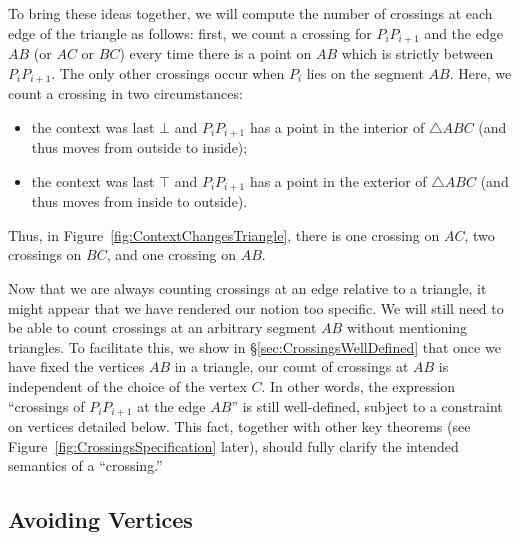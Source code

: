 To bring these ideas together, we will compute the number of crossings at each edge of the triangle as follows: first, we count a crossing for $P_iP_{i+1}$ and the edge $AB$ (or $AC$ or $BC$) every time there is a point on $AB$ which is strictly between $P_iP_{i+1}$. The only other crossings occur when $P_i$ lies on the segment $AB$. Here, we count a crossing in two circumstances:
\begin{itemize}
\item the context was last $\bot$ and $P_iP_{i+1}$ has a point in the interior of $\triangle ABC$ (and thus moves from outside to inside);
\item the context was last $\top$ and $P_iP_{i+1}$ has a point in the exterior of $\triangle ABC$ (and thus moves from inside to outside).
\end{itemize}

Thus, in Figure~\ref{fig:ContextChangesTriangle}, there is one crossing on $AC$, two crossings on $BC$, and one crossing on $AB.$

Now that we are always counting crossings at an edge relative to a triangle, it might appear that we have rendered our notion too specific. We will still need to be able to count crossings at an arbitrary segment $AB$ without mentioning triangles. To facilitate this, we show in \S\ref{sec:CrossingsWellDefined} that once we have fixed the vertices $AB$ in a triangle, our count of crossings at $AB$ is independent of the choice of the vertex $C$. In other words, the expression ``crossings of $P_iP_{i+1}$ at the edge $AB$'' is still well-defined, subject to a constraint on vertices detailed below. This fact, together with other key theorems (see Figure~\ref{fig:CrossingsSpecification} later), should fully clarify the intended semantics of a ``crossing.''

\subsection{Avoiding Vertices}\label{sec:EdgeCases}

